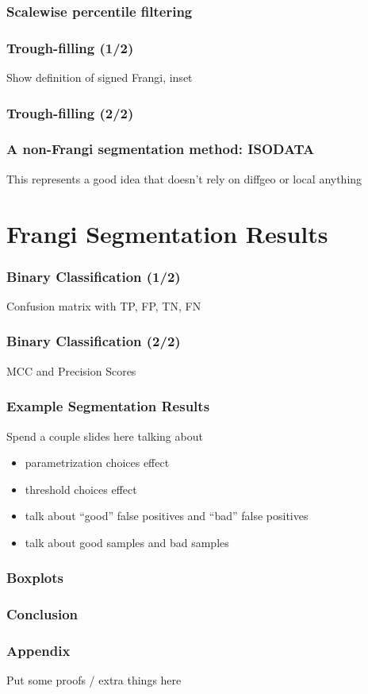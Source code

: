 \documentclass[9pt,notes]{beamer}
\begin{document}
\begin{frame}
\frametitle{Scalewise percentile filtering}
\end{frame}

\begin{frame}
\frametitle{Trough-filling (1/2)}
Show definition of signed Frangi, inset
\end{frame}

\begin{frame}
\frametitle{Trough-filling (2/2)}
\end{frame}

\begin{frame}
\frametitle{A non-Frangi segmentation method: ISODATA}
This represents a good idea that doesn't rely on diffgeo or local anything
\end{frame}

\section{Frangi Segmentation Results}
\begin{frame}
\frametitle{Binary Classification (1/2)}
Confusion matrix with TP, FP, TN, FN
\end{frame}

\begin{frame}
\frametitle{Binary Classification (2/2)}
MCC and Precision Scores
\end{frame}

\begin{frame}
\frametitle{Example Segmentation Results}
Spend a couple slides here talking about
\begin{itemize}
  \item parametrization choices effect
  \item threshold choices effect
  \item talk about ``good'' false positives and  ``bad'' false positives
  \item talk about good samples and bad samples
\end{itemize}
\end{frame}

\begin{frame}
\frametitle{Boxplots}
\end{frame}

\begin{frame}
\frametitle{Conclusion}
\end{frame}

\begin{frame}
\frametitle{Appendix}
Put some proofs / extra things here
\end{frame}
\end{document}
